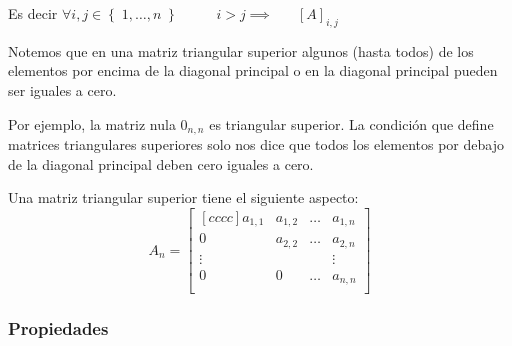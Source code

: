 \documentclass[12pt, fleqn]{report}                             %
\DeclareMathOperator \Space {\quad}                             %
\DeclareMathOperator \MegaSpace {\quad \quad}                   %
\theoremstyle{break}                                            %
\newcommand{\Set}[1]    {\left\{ \; #1 \; \right\}}             %
\begin{document}
                Es decir $\forall i, j \in \Set{1, \dots, n} \MegaSpace i > j \implies \Space [A]_{i, j}$

                \vspace{1em}

                Notemos que en una matriz triangular superior algunos (hasta todos) de los elementos
                por encima de la diagonal principal o en la diagonal principal pueden ser iguales a cero.

                Por ejemplo, la matriz nula $0_{n,n}$ es triangular superior. La condición que define
                matrices triangulares superiores solo nos dice que todos los elementos por debajo de la
                diagonal principal deben cero iguales a cero.

                Una matriz triangular superior tiene el siguiente aspecto:
                \begin{equation*}
                    A_n =
                    \begin{bmatrix}[cccc]
                        a_{1,1} & a_{1, 2}  & \dots & a_{1, n}  \\
                        0       & a_{2,2}   & \dots & a_{2, n}  \\
                        \vdots  &           &       & \vdots    \\
                        0       & 0         & \dots & a_{n,n}   \\
                    \end{bmatrix}
                \end{equation*}

                \clearpage
                \subsubsection{Propiedades}
\end{document}
